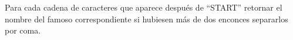 \outputText

Para cada cadena de caracteres que aparece después de “START” retornar el nombre del famoso correspondiente si hubiesen más de dos enconces separarlos por coma.


\exampleCases

\begin{example}
\end{example}


